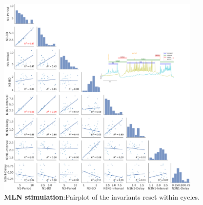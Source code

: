 \begin{figure}[htbp]
	\centering
	\includegraphics[width=0.9\textwidth]{./img/invariants/data/SUSSEX/MLN_driven/images/panel_with_pairplot.png}
	\caption{\textbf{MLN stimulation}:Pairplot of the invariants reset within cycles.}
	\label{fig:mln stimulation pairplot}
\end{figure}

\newpage
